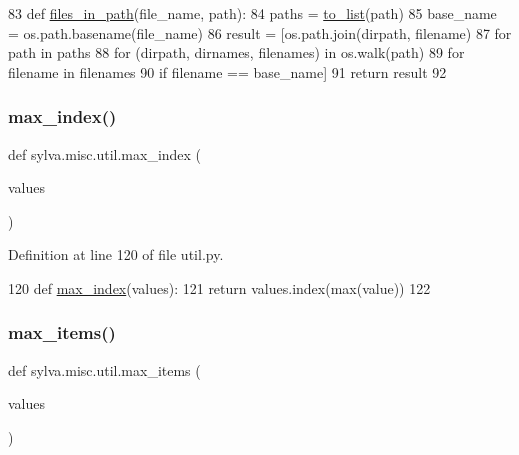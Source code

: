 \begin{DoxyCode}
83 \textcolor{keyword}{def }\hyperlink{namespacesylva_1_1misc_1_1util_a7ad460a52be16d3083cb41f0be004714}{files\_in\_path}(file\_name, path):
84     paths = \hyperlink{namespacesylva_1_1misc_1_1util_a03f5cfd365a10a5ec0567e320f987a9b}{to\_list}(path)
85     base\_name = os.path.basename(file\_name)
86     result = [os.path.join(dirpath, filename)
87               \textcolor{keywordflow}{for} path \textcolor{keywordflow}{in} paths
88               \textcolor{keywordflow}{for} (dirpath, dirnames, filenames) \textcolor{keywordflow}{in} os.walk(path)
89               \textcolor{keywordflow}{for} filename \textcolor{keywordflow}{in} filenames
90               \textcolor{keywordflow}{if} filename == base\_name]
91     \textcolor{keywordflow}{return} result
92 
\end{DoxyCode}
\mbox{\label{namespacesylva_1_1misc_1_1util_a32b5da1967e998035c511c75ccccdf89}} 
\subsubsection{\texorpdfstring{max\+\_\+index()}{max\_index()}}
{\footnotesize\ttfamily def sylva.\+misc.\+util.\+max\+\_\+index (\begin{DoxyParamCaption}\item[{}]{values }\end{DoxyParamCaption})}



Definition at line 120 of file util.\+py.


\begin{DoxyCode}
120 \textcolor{keyword}{def }\hyperlink{namespacesylva_1_1misc_1_1util_a32b5da1967e998035c511c75ccccdf89}{max\_index}(values):
121     \textcolor{keywordflow}{return} values.index(max(value))
122 
\end{DoxyCode}
\mbox{\label{namespacesylva_1_1misc_1_1util_ab250130a1258b854bd002c06c3467f57}} 
\subsubsection{\texorpdfstring{max\+\_\+items()}{max\_items()}}
{\footnotesize\ttfamily def sylva.\+misc.\+util.\+max\+\_\+items (\begin{DoxyParamCaption}\item[{}]{values }\end{DoxyParamCaption})}



